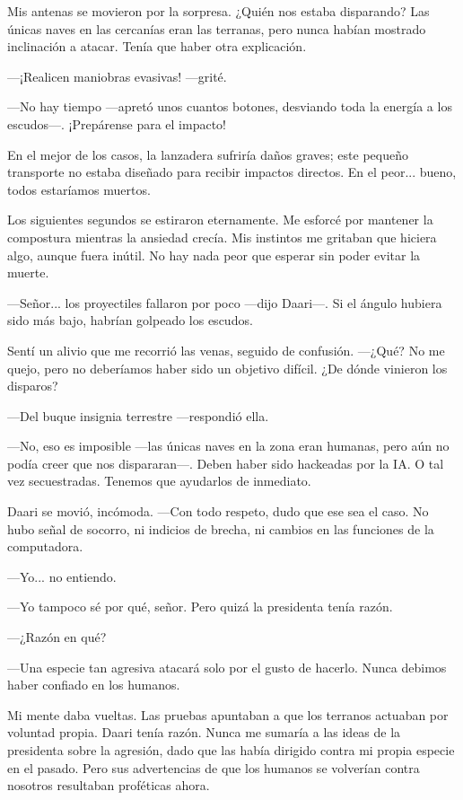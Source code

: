 Mis antenas se movieron por la sorpresa. ¿Quién nos estaba disparando? Las únicas naves en las cercanías eran las terranas, pero nunca habían mostrado inclinación a atacar. Tenía que haber otra explicación.

—¡Realicen maniobras evasivas! —grité.

—No hay tiempo —apretó unos cuantos botones, desviando toda la energía a los escudos—. ¡Prepárense para el impacto!

En el mejor de los casos, la lanzadera sufriría daños graves; este pequeño transporte no estaba diseñado para recibir impactos directos. En el peor... bueno, todos estaríamos muertos.

Los siguientes segundos se estiraron eternamente. Me esforcé por mantener la compostura mientras la ansiedad crecía. Mis instintos me gritaban que hiciera algo, aunque fuera inútil. No hay nada peor que esperar sin poder evitar la muerte.

—Señor... los proyectiles fallaron por poco —dijo Daari—. Si el ángulo hubiera sido más bajo, habrían golpeado los escudos.

Sentí un alivio que me recorrió las venas, seguido de confusión. —¿Qué? No me quejo, pero no deberíamos haber sido un objetivo difícil. ¿De dónde vinieron los disparos?

—Del buque insignia terrestre —respondió ella.

—No, eso es imposible —las únicas naves en la zona eran humanas, pero aún no podía creer que nos dispararan—. Deben haber sido hackeadas por la IA. O tal vez secuestradas. Tenemos que ayudarlos de inmediato.

Daari se movió, incómoda. —Con todo respeto, dudo que ese sea el caso. No hubo señal de socorro, ni indicios de brecha, ni cambios en las funciones de la computadora.

—Yo... no entiendo.

—Yo tampoco sé por qué, señor. Pero quizá la presidenta tenía razón.

 —¿Razón en qué?

—Una especie tan agresiva atacará solo por el gusto de hacerlo. Nunca debimos haber confiado en los humanos.

Mi mente daba vueltas. Las pruebas apuntaban a que los terranos actuaban por voluntad propia. Daari tenía razón. Nunca me sumaría a las ideas de la presidenta sobre la agresión, dado que las había dirigido contra mi propia especie en el pasado. Pero sus advertencias de que los humanos se volverían contra nosotros resultaban proféticas ahora.

